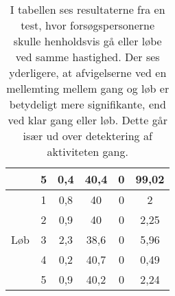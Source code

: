 \begin{table}[H]
\begin{tabular}{cccccc}
		& 5             & 0,4                                                                                                & 40,4                                                                                                & 0      & 99,02                                                                                               \\ \hline
		\multirow{5}{*}{Løb}                                                      & 1                                                                                                          & 0,8 & 40                                                                                             & 0     & 2                                                                                                \\
		& 2                                                                                           & 0,9  & 40                                                                                            & 0         & 2,25                                                                                            \\
		& 3                                                                                              & 2,3    & 38,6                                                                                            & 0      & 5,96                                                                                               \\
		& 4                                                                                                      & 0,2  & 40,7                                                                                            & 0     & 0,49                                                                                                \\
		& 5                                                                                                    & 0,9     & 40,2                                                                                           & 0         & 2,24   \\ \hline 
		\end{tabular}
	\caption{I tabellen ses resultaterne fra en test, hvor forsøgspersonerne skulle henholdsvis gå eller løbe ved samme hastighed. Der ses yderligere, at afvigelserne ved en mellemting mellem gang og løb er betydeligt mere signifikante, end ved klar gang eller løb. Dette går især ud over detektering af aktiviteten gang.}
	\label{tab:samletsys_8kmt}
\end{table}
